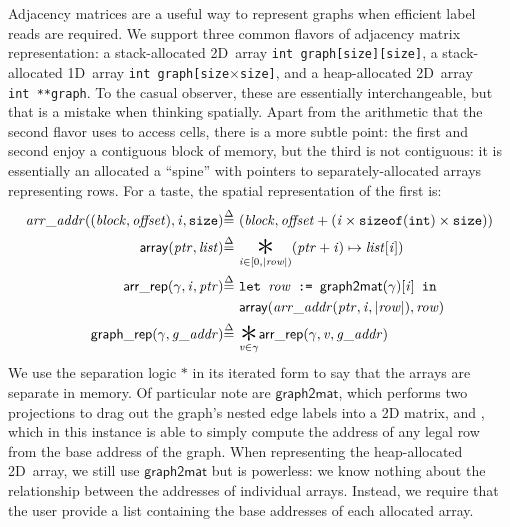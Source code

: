 Adjacency matrices are a useful way to represent graphs
when efficient label reads are required. 
We support three common 
flavors of adjacency matrix representation:
a stack-allocated 2D~array \texttt{int~graph[size][size]},
a stack-allocated 1D~array \texttt{int~graph[size$\times$size]}, 
and a heap-allocated 2D~array \texttt{int~**graph}. 
To the casual observer, these are essentially interchangeable, but 
that is a mistake when thinking spatially. Apart from the 
arithmetic that the second flavor uses to access cells, there is a 
more subtle point: the first and second enjoy a contiguous block of 
memory, but the third is not contiguous: it is essentially an allocated
a ``spine'' with pointers to separately-allocated arrays representing rows.
For a taste, the spatial representation of the first is:
\vspace{-0.5em}
\begin{equation*}
\begin{split}
\m{arr\_addr} ((\m{block}, \m{offset}), \m{i},\texttt{size}) \defeq~&
  (\m{block}, \m{offset} + (\m{i} \times \texttt{sizeof}(\texttt{int}) \times \texttt{size})) \\
\mathsf{array}(\m{ptr},\m{list}) \defeq~& \underset{\m{i} \in [0, \lvert\m{row}\rvert)}{\bigstar} (\m{ptr} + \m{i}) \mapsto \m{list}[\m{i}]) \\
\p{arr\_rep}(\gamma, \m{i}, \m{ptr}) \defeq~& \texttt{let }\m{row} \texttt{ := }\mathsf{graph2mat}(\gamma)[\m{i}] \texttt{ in } \\
&\mathsf{array}(\m{arr\_addr}(\m{ptr},\m{i},\lvert\m{row}\rvert), \m{row}) \\
\vspace{1em}
\p{graph\_rep}(\gamma, \m{g\_addr}) \defeq~& \underset{\m{v} \in \gamma}{\bigstar} \p{arr\_rep}(\gamma, \m{v}, \m{g\_addr})
\end{split}
\end{equation*}
We use the separation logic $\ast$ in its iterated form
to say that the arrays are separate in memory. 
Of particular note are $\mathsf{graph2mat}$, which performs two projections to
drag out the graph's nested edge labels into a 2D matrix, and 
, which in this instance is able to simply compute
the address of any legal row  from the base address of the graph.
When representing the heap-allocated 2D~array, we still use 
$\mathsf{graph2mat}$ but  is powerless: 
we know nothing about the relationship
between the addresses of individual arrays.
Instead, we require that the user provide a list containing the base addresses
of each allocated array. 

